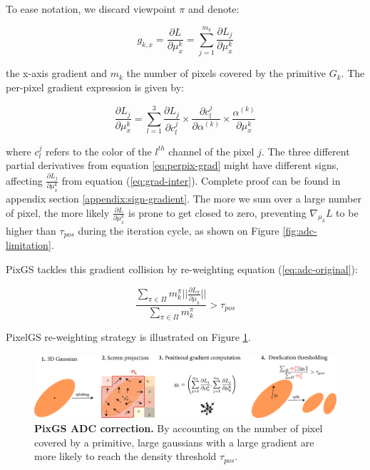 To ease notation, we discard viewpoint $\pi$ and denote: 

\begin{equation}
\label{eq:grad-inter}
    g_{k,x} = \frac{\partial L}{\partial \mu^{k}_{x}} = \sum \limits_{j=1}^{m_{k}} \frac{\partial L_{j}}{\partial \mu^{k}_{x}} 
\end{equation}

the x-axis gradient and $m_{k}$ the number of pixels covered by the primitive $G_{k}$. The per-pixel gradient expression is given by: 

\begin{equation}
\label{eq:perpix-grad}
\frac{\partial L_{j}}{\partial \mu^{k}_{x}} = \sum \limits_{l=1}^{3} \frac{\partial L_{j}}{\partial c_{l}^{j}}\times \frac{\partial c_{l}^{j}}{\partial \alpha^{(k)}} \times \frac{\alpha^{(k)}}{\partial \mu^{k}_{x} }
\end{equation}

where $c_{l}^{j}$ refers to the color of the $l^{th}$ channel of the pixel $j$. The three different partial derivatives from equation \eqref{eq:perpix-grad} might have different signs, affecting $\frac{\partial L_{j}}{\partial \mu^{k}_{x}}$ from equation (\ref{eq:grad-inter}). Complete proof can be found in appendix section \ref{appendix:sign-gradient}. The more we sum over a large number of pixel, the more likely $\frac{\partial L}{\partial \mu^{k}_{x}}$ is prone to get closed to zero, preventing $\nabla_{\mu_{k}}L$ to be higher than $\tau_{pos}$ during the iteration cycle, as shown on Figure \ref{fig:adc-limitation}. 

PixGS tackles this gradient collision by re-weighting equation (\ref{eq:adc-original}): 

\begin{equation}
\frac{\sum \limits_{\pi \in \Pi} m_{k}^{\pi} ||\frac{\partial L_{\pi}}{\partial \mu_{k}}||}{\sum \limits_{\pi \in \Pi}m_{k}^{\pi}} > \tau_{pos}
\label{eq:adc-pixgs}
\end{equation}

PixelGS re-weighting strategy is illustrated on Figure \ref{fig:pixgs-adc}. 


\begin{figure}[htbp!]
    \center
  \includegraphics[width=\linewidth]{images/gaussiansplatting/pixgs_implem_improvement_NEW.png}
  \caption{\textbf{PixGS ADC correction.} By accounting on the number of pixel covered by a primitive, large gaussians with a large gradient are more likely to reach the density threshold $\tau_{pos}$.}
  \label{fig:pixgs-adc}
\end{figure}


